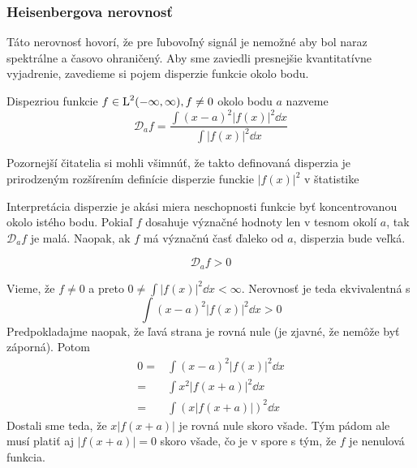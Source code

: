 \subsubsection{Heisenbergova nerovnosť}

Táto nerovnosť hovorí, že pre ľubovoľný signál je nemožné aby bol
naraz spektrálne a časovo ohraničený.
Aby sme zaviedli presnejšie kvantitatívne vyjadrenie, zavedieme si pojem
disperzie funkcie okolo bodu.

\def\disperzia#1{\mathcal{D}_{#1}}
\begin{definicia}
    Dispezriou funkcie $f \in \mbox{L}^2(-\infty,\infty), f \not = 0$ okolo bodu $a$ nazveme
    \begin{equation}
        \disperzia{a} f = \frac{\int (x-a)^2 |f(x)|^2 \dd x}
                               {\int |f(x)|^2 \dd x}
    \end{equation}
\end{definicia}
\begin{poznamka}
    Pozornejší čitatelia si mohli všimnúť, že takto definovaná
    disperzia je prirodzeným rozšírením definície disperzie funckie
    $|f(x)|^2$ v štatistike
\end{poznamka}

Interpretácia disperzie je akási miera neschopnosti funkcie byť
koncentrovanou okolo istého bodu. Pokiaľ $f$ dosahuje význačné hodnoty
len v tesnom okolí $a$, tak $\disperzia{a}f$ je malá. Naopak, ak
$f$ má význačnú časť ďaleko od $a$, disperzia bude veľká.

\begin{lema}
    \begin{equation}
        \disperzia{a}f > 0
    \end{equation}
    \label{lema:nenulova_disperzia}
\end{lema}
\begin{dokaz}
    Vieme, že $f\not=0$ a preto $0 \not=\int |f(x)|^2 \dd x <\infty$.
    Nerovnosť je teda ekvivalentná s
    \begin{equation}
        \int (x-a)^2 |f(x)|^2 \dd x > 0
    \end{equation}
    Predpokladajme naopak, že ľavá strana je rovná nule (je zjavné, že
    nemôže byť záporná). Potom
    \begin{equation}
    \begin{split}
     0 = & \int (x-a)^2 |f(x)|^2 \dd x \\
         =& \int x^2 |f(x+a)|^2 \dd x \\
         =& \int (x |f(x+a)|)^2 \dd x
    \end{split}
    \end{equation}
    Dostali sme teda, že $x|f(x+a)|$ je rovná nule skoro všade.
    Tým pádom ale musí platiť aj $|f(x+a)|=0$ skoro všade, čo je 
    v spore s tým, že $f$ je nenulová funkcia.
\end{dokaz}


